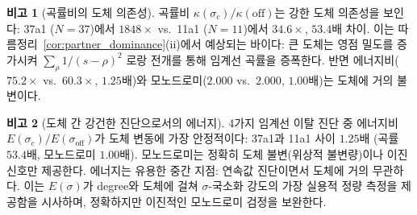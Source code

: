 \documentclass[11pt, a4paper]{article}
\theoremstyle{definition}
\newtheorem{remark}{비고}[section]
\theoremstyle{plain}
\begin{document}
\begin{remark}[곡률비의 도체 의존성]
\label{rem:kappa_conductor}
곡률비 $\kappa(\sigma_c)/\kappa(\mathrm{off})$는 강한 도체 의존성을 보인다:
37a1 ($N=37$)에서 $1848\times$ vs.\ 11a1 ($N=11$)에서 $34.6\times$,
$53.4$배 차이.
이는 따름정리~\ref{cor:partner_dominance}(ii)에서 예상되는 바이다:
큰 도체는 영점 밀도를 증가시켜
$\sum_\rho 1/(s-\rho)^2$ 로랑 전개를 통해 임계선 곡률을 증폭한다.
반면 에너지비($75.2\times$ vs.\ $60.3\times$, $1.25$배)와
모노드로미($2.000$ vs.\ $2.000$, $1.00$배)는 도체에 거의 불변이다.
\end{remark}


\begin{remark}[도체 간 강건한 진단으로서의 에너지]
\label{rem:energy_robust}
4가지 임계선 이탈 진단 중 에너지비 $E(\sigma_c)/E(\sigma_{\mathrm{off}})$가
도체 변동에 가장 안정적이다:
37a1과 11a1 사이 $1.25$배 (곡률 $53.4$배, 모노드로미 $1.00$배).
모노드로미는 정확히 도체 불변(위상적 불변량)이나 이진 신호만 제공한다.
에너지는 유용한 중간 지점: 연속값 진단이면서 도체에 거의 무관하다.
이는 $E(\sigma)$가 degree와 도체에 걸쳐 $\sigma$-국소화 강도의
가장 실용적 정량 측정을 제공함을 시사하며,
정확하지만 이진적인 모노드로미 검정을 보완한다.
\end{remark}
\end{document}
